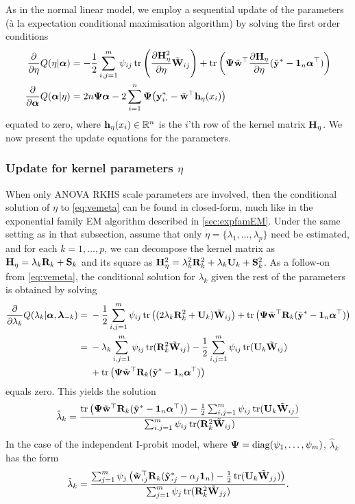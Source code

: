 As in the normal linear model, we employ a sequential update of the parameters (à la expectation conditional maximisation algorithm) by solving the first order conditions
\begin{align}
  \frac{\partial}{\partial\eta}Q(\eta|\balpha)
  &= -\half \sum_{i,j=1}^m \psi_{ij} \tr \left( \frac{\partial \bH_\eta^2}{\partial\eta} \tilde\bW_{ij} \right) 
  + \tr\left( \bPsi \tilde\bw^\top  \frac{\partial \bH_\eta}{\partial\eta} (\tilde\by^* - \bone_n\balpha^\top)  \right) \label{eq:vemeta} \\
  \frac{\partial}{\partial\balpha}Q(\balpha|\eta)
  &= 2n\bPsi\balpha - 2 \sum_{i=1}^n \bPsi \big(\by_{i\bigcdot}^* - \tilde\bw^\top\bh_\eta(x_i) \big) \label{eq:vemalpha}
\end{align}
equated to zero, where ${\mathbf h}_\eta(x_i) \in \mathbb{R}^n$ is the $i$'th row of the kernel matrix ${\mathbf H}_\eta$.
We now present the update equations for the parameters.
\vspace{-0.5em}

\subsubsection{Update for kernel parameters $\eta$}

When only ANOVA RKHS scale parameters are involved, then the conditional solution of $\eta$ to \cref{eq:vemeta} can be found in closed-form, much like in the exponential family EM algorithm described in \cref{sec:expfamEM}.
Under the same setting as in that subsection, assume that only $\eta = \{\lambda_1,\dots,\lambda_p\}$ need be estimated, and for each $k=1,\dots,p$, we can decompose the kernel matrix as ${\mathbf H}_\eta = \lambda_k {\mathbf R}_k + {\mathbf S}_k$ and its square as ${\mathbf H}_\eta^2 = \lambda_k^2 {\mathbf R}_k^2 + \lambda_k {\mathbf U}_k + {\mathbf S}_k^2$.
As a follow-on from \cref{eq:vemeta}, the conditional solution for $\lambda_k$ given the rest of the parameters is obtained by solving
\vspace{-0.5em}
\begin{align*}
  \frac{\partial}{\partial\lambda_k}Q(\lambda_k|{\bm\alpha},{\bm\lambda}_{-k})
  ={}& -\frac{1}{2} \sum_{i,j=1}^m \psi_{ij} \operatorname{tr} \left( (2\lambda_k{\mathbf R}_k^2 + {\mathbf U}_k) \tilde{{\mathbf W}}_{ij} \right) 
  + \operatorname{tr}\left( {\bm\Psi} \tilde{{\mathbf w}}^\top {\mathbf R}_k (\tilde{{\mathbf y}}^* - {\mathbf 1}_n{\bm\alpha}^\top)  \right) \\
  ={}& - \lambda_k \sum_{i,j=1}^m \psi_{ij} \operatorname{tr}({\mathbf R}_k^2\tilde{{\mathbf W}}_{ij})
  - \frac{1}{2} \sum_{i,j=1}^m \psi_{ij} \operatorname{tr}({\mathbf U}_k\tilde{{\mathbf W}}_{ij}) \\
  &+ \operatorname{tr}\left( {\bm\Psi} \tilde{{\mathbf w}}^\top {\mathbf R}_k (\tilde{{\mathbf y}}^* - {\mathbf 1}_n{\bm\alpha}^\top)  \right)
\end{align*}
equals zero. 
This yields the solution
\[
  \hat\lambda_k 
  = \frac{
  \operatorname{tr}\left( {\bm\Psi} \tilde{{\mathbf w}}^\top {\mathbf R}_k (\tilde{{\mathbf y}}^* - {\mathbf 1}_n{\bm\alpha}^\top) \right)
  - \frac{1}{2} \sum_{i,j=1}^m \psi_{ij} \operatorname{tr}({\mathbf U}_k\tilde{{\mathbf W}}_{ij})
  }{
  \sum_{i,j=1}^m \psi_{ij} \operatorname{tr}({\mathbf R}_k^2\tilde{{\mathbf W}}_{ij})
  }
\]
In the case of the independent I-probit model, where ${\bm\Psi} = \operatorname{diag}(\psi_1,\dots,\psi_m)$, $\hat\lambda_k$ has the form
\[
  \hat\lambda_k
  = \frac{
  \sum_{j=1}^m \psi_j \left( \tilde\bw^\top_{\bigcdot j} \bR_k (\tilde\by^*_{\bigcdot j} - \alpha_j\bone_n) - \half \tr(\bU_k\tilde\bW_{jj})\right)
  }{
  \sum_{j=1}^m \psi_j \tr(\bR_k^2\tilde\bW_{jj})
  }.
\]

